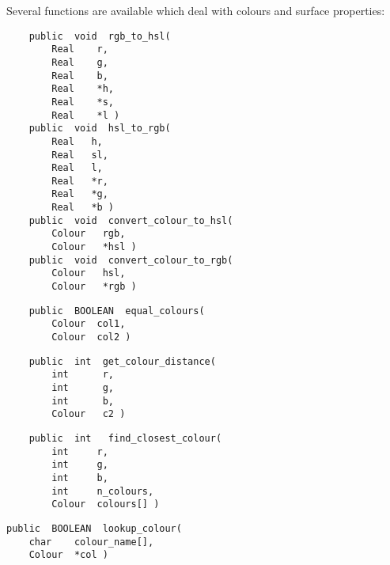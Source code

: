 Several functions are available which deal with colours and surface
properties:

{\bf\begin{verbatim}
    public  void  rgb_to_hsl(
        Real    r,
        Real    g,
        Real    b,
        Real    *h,
        Real    *s,
        Real    *l )
    public  void  hsl_to_rgb(
        Real   h,
        Real   sl,
        Real   l,
        Real   *r,
        Real   *g,
        Real   *b )
    public  void  convert_colour_to_hsl(
        Colour   rgb,
        Colour   *hsl )
    public  void  convert_colour_to_rgb(
        Colour   hsl,
        Colour   *rgb )
\end{verbatim}}


{\bf\begin{verbatim}
    public  BOOLEAN  equal_colours(
        Colour  col1,
        Colour  col2 )
\end{verbatim}}


{\bf\begin{verbatim}
    public  int  get_colour_distance(
        int      r,
        int      g,
        int      b,
        Colour   c2 )
\end{verbatim}}


{\bf\begin{verbatim}
    public  int   find_closest_colour(
        int     r,
        int     g,
        int     b,
        int     n_colours,
        Colour  colours[] )
\end{verbatim}}


{\bf\begin{verbatim}
public  BOOLEAN  lookup_colour(
    char    colour_name[],
    Colour  *col )
\end{verbatim}}


